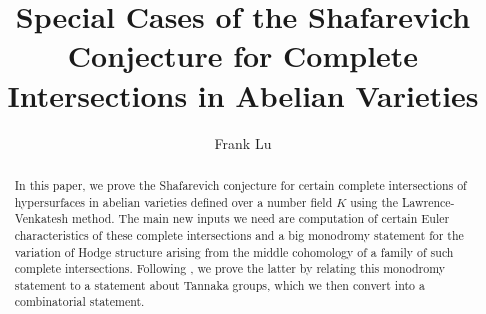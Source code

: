 \documentclass{article}
\title{Special Cases of the Shafarevich Conjecture for Complete Intersections in Abelian Varieties}
\author{Frank Lu}
\date{}
\theoremstyle{definition}
\theoremstyle{remark}
\begin{document}
\maketitle
\begin{abstract}
In this paper, we prove the Shafarevich conjecture for certain complete intersections of hypersurfaces in abelian varieties defined over a number field $K$ using the Lawrence-Venkatesh method. The main new inputs we need are computation of certain Euler characteristics of these complete intersections and a big monodromy statement for the variation of Hodge structure arising from the middle cohomology of a family of such complete intersections. Following \cite{ls25}, we prove the latter by relating this monodromy statement to a statement about Tannaka groups, which we then convert into a combinatorial statement.
\end{abstract}
\tableofcontents
\end{document}

